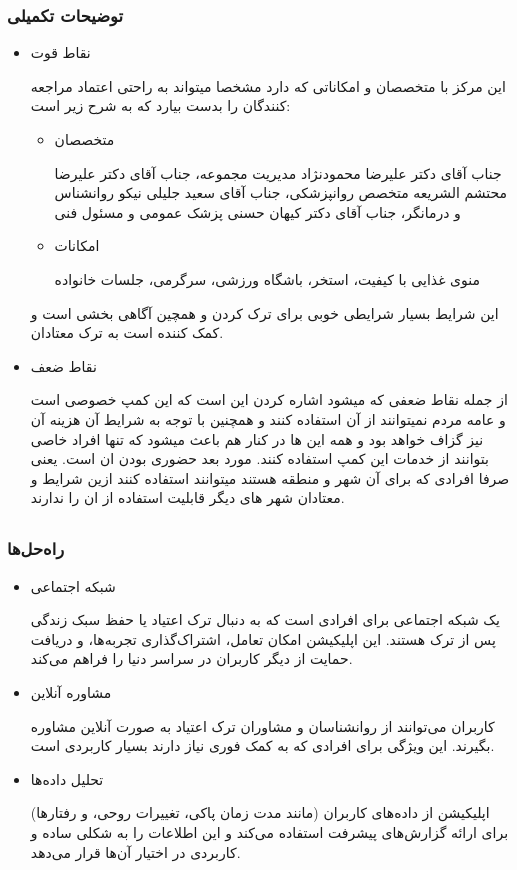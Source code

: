 \documentclass[dvipsnames, svgnames, x11names, 11pt]{article}
\begin{document}
\subsubsection{توضیحات تکمیلی}
\begin{itemize}
\item 
نقاط قوت

این مرکز با متخصصان و امکاناتی که دارد مشخصا میتواند به راحتی اعتماد مراجعه کنندگان را بدست بیارد که به شرح زیر است:

\begin{itemize}
\item 
متخصصان

جناب آقای دکتر علیرضا محمودنژاد مدیریت مجموعه، جناب آقای دکتر علیرضا محتشم الشریعه متخصص روانپزشکی، جناب آقای سعید جلیلی نیکو روانشناس و درمانگر، جناب آقای دکتر کیهان حسنی پزشک عمومی و مسئول فنی

\item
امکانات

منوی غذایی با کیفیت، استخر، باشگاه ورزشی، سرگرمی، جلسات خانواده
\end{itemize}
این شرایط بسیار شرایطی خوبی برای ترک کردن و همچین آگاهی بخشی است و کمک کننده است به ترک معتادان.

\item 
نقاط ضعف

از جمله نقاط ضعفی که میشود اشاره کردن این است که این کمپ خصوصی است و عامه مردم نمیتوانند از آن استفاده کنند و همچنین با توجه به شرایط آن هزینه آن نیز گزاف خواهد بود و همه این ها در کنار هم باعث میشود که تنها افراد خاصی بتوانند از خدمات این کمپ استفاده کنند. مورد بعد حضوری بودن ان است. یعنی صرفا افرادی که برای آن شهر و منطقه هستند میتوانند استفاده کنند ازین شرایط و معتادان شهر های دیگر قابلیت استفاده از ان را ندارند.
\end{itemize}


\subsection{}
\subsubsection{راه‌حل‌ها}
\begin{itemize}
\item 
شبکه اجتماعی

یک شبکه اجتماعی برای افرادی است که به دنبال ترک اعتیاد یا حفظ سبک زندگی پس از ترک هستند. این اپلیکیشن امکان تعامل، اشتراک‌گذاری تجربه‌ها، و دریافت حمایت از دیگر کاربران در سراسر دنیا را فراهم می‌کند.

\item 
مشاوره آنلاین

کاربران می‌توانند از روانشناسان و مشاوران ترک اعتیاد به صورت آنلاین مشاوره بگیرند. این ویژگی برای افرادی که به کمک فوری نیاز دارند بسیار کاربردی است.

\item 
تحلیل داده‌ها

اپلیکیشن از داده‌های کاربران (مانند مدت زمان پاکی، تغییرات روحی، و رفتارها) برای ارائه گزارش‌های پیشرفت استفاده می‌کند و این اطلاعات را به شکلی ساده و کاربردی در اختیار آن‌ها قرار می‌دهد.
\end{itemize}
\end{document}
